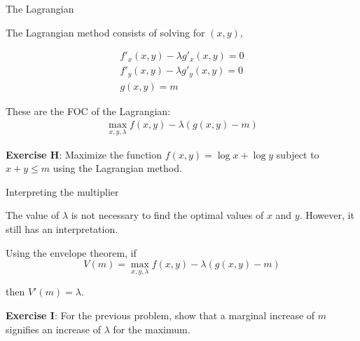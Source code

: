 \documentclass[handout]{beamer}
\begin{document}
\begin{frame}{The Lagrangian}

The Lagrangian method consists of solving for $(x,y)$, 

\begin{eqnarray}
f'_x(x,y) -  \lambda g'_x(x,y) = 0 \\
f'_y(x,y) -  \lambda g'_y(x,y) = 0 \\
g(x,y) = m
\end{eqnarray} 

These are the FOC of the Lagrangian: 
\begin{eqnarray}
	\max_{x,y,\lambda} f(x,y) - \lambda (g(x,y)-m)
\end{eqnarray} 

\textbf{Exercise H}: Maximize the function $f(x,y) = \log x + \log y$ subject to $x+y \le m$ using the Lagrangian method.
\end{frame}

\begin{frame}{Interpreting the multiplier}

The value of $\lambda$ is not necessary to find the optimal values of $x$ and $y$. However, it still has an interpretation.

Using the envelope theorem, if $$V(m) = \max_{x,y,\lambda} f(x,y) - \lambda (g(x,y)-m)$$

then $V'(m) = \lambda$. 
\vspace{0.5in}

\textbf{Exercise I}: For the previous problem, show that a marginal increase of $m$ signifies an increase of $\lambda$ for the maximum. 
\end{frame}
\end{document}
